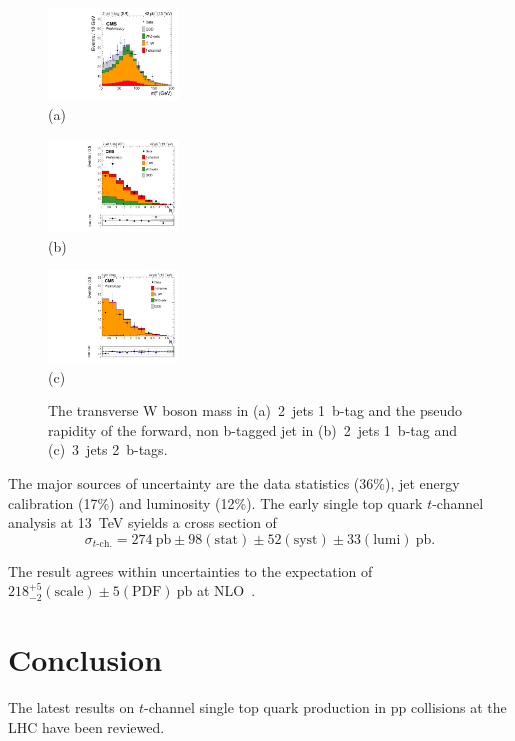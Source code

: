 \documentclass{PoS}
\begin{document}
\begin{figure}[htbp]
\begin{center}
\parbox[t]{0.32\textwidth}{\centering\includegraphics[width=0.31\textwidth]{cms_xsec13/mtw.pdf}\\(a)}
\parbox[t]{0.32\textwidth}{\centering\includegraphics[width=0.31\textwidth]{cms_xsec13/mu2j1t.pdf}\\(b)}
\parbox[t]{0.32\textwidth}{\centering\includegraphics[width=0.31\textwidth]{cms_xsec13/mu3j2t.pdf}\\(c)}
\end{center}
\caption{\label{fig:singletop13}The transverse W boson mass in (a)~2~jets 1~b-tag and the pseudo rapidity of the forward, non b-tagged jet in (b)~2~jets 1~b-tag and (c)~3~jets 2~b-tags.}
\end{figure}

The major sources of uncertainty are the data statistics (36\%), jet energy calibration (17\%) and luminosity (12\%).
The early single top quark $t$-channel analysis at 13~TeV syields a cross section of
\begin{equation}
\sigma_{t\mbox{-}\mathrm{ch.}}=274~\mathrm{pb}\pm98\mathrm{(stat)}\pm52\mathrm{(syst)}\pm33\mathrm{(lumi)}~\mathrm{pb}.
\end{equation}

The result agrees within uncertainties to the expectation of $218_{-2}^{+5}\mathrm{(scale)}\pm5\mathrm{(PDF)}~\mathrm{pb}$ at NLO~\cite{Kidonakis-8tev}.

\section{Conclusion}
The latest results on $t$-channel single top quark production in pp collisions at the LHC have been reviewed.
\end{document}
